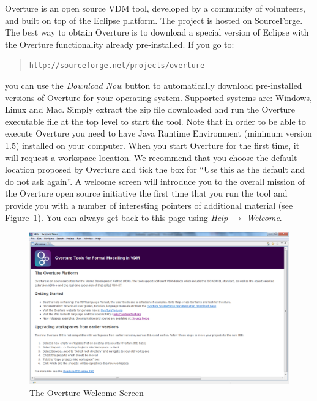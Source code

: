 \documentclass{overturerepchap}
\newcommand{\url}[1]{\texttt{#1}}
\begin{document}
Overture is an open source VDM tool, developed by a community of volunteers,
and built on top of the Eclipse platform. The project 
is hosted on SourceForge.  The best way to obtain Overture is to download 
a special version of Eclipse with the Overture functionality already pre-installed. If you go to:
  \begin{quote}
  \url{http://sourceforge.net/projects/overture}
  \end{quote}
  \noindent you can use the \textit{Download Now} button to
  automatically download pre-installed versions of Overture for your
  operating system.  Supported systems are: Windows, Linux and
  Mac.
Simply extract the zip file downloaded and run the Overture executable
file at the top level to start the tool. Note that in order to be able
to execute Overture you need to have Java Runtime Environment (minimum
version 1.5) installed on your computer.
When you start Overture for the first time, it will request a workspace
location. We recommend that you choose the default location proposed 
by Overture and tick the box for ``Use this as the default and do
not ask again''. A welcome screen will introduce you to the overall 
mission of the Overture open source initiative the first time that you
run the tool and provide you with a number of interesting pointers of
additional material (see
Figure~\ref{fig:userguire:welcomeWindow}). You
can always get back to this page using \emph{Help} $ \rightarrow$
\emph{Welcome}. 

\begin{figure}[!htb]
\begin{center}
  \includegraphics[width=\textwidth]{screenDumps/welcomeWindow}
  \caption{The Overture Welcome Screen}
  \label{fig:userguire:welcomeWindow}
\end{center}
\end{figure}
\end{document}
